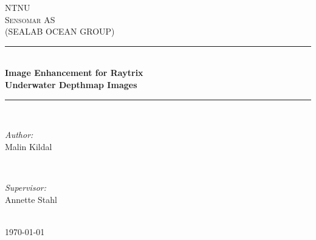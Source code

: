 \documentclass[11pt]{article}
\begin{document}
\begin{titlepage}

\newcommand{\HRule}{\rule{\linewidth}{0.5mm}}
\center

\textsc{\LARGE NTNU}\\[1.0cm]
\textsc{\LARGE Sensomar AS \\[0.3cm]
(SEALAB OCEAN GROUP)}\\[3.0cm]

\HRule \\[0.5cm]
{ \huge \bfseries Image Enhancement for Raytrix \\[0.2cm]
Underwater Depthmap Images}\\[0.5cm]
\HRule \\[3.0cm]

\begin{minipage}{0.4\textwidth}
\begin{flushleft} \large
\emph{Author:}\\
Malin Kildal
\end{flushleft}
\end{minipage}
~
\begin{minipage}{0.4\textwidth}
\begin{flushright} \large
\emph{Supervisor:} \\
Annette Stahl
\end{flushright}
\end{minipage}\\[5cm]

{\large \today}\\[1cm]

\end{titlepage}



\clearpage


\clearpage

\listoffigures
{}
\clearpage

\tableofcontents
\clearpage


\clearpage


\clearpage


\clearpage


\clearpage


\clearpage


\clearpage


\clearpage


\clearpage


\clearpage



\clearpage
\end{document}
